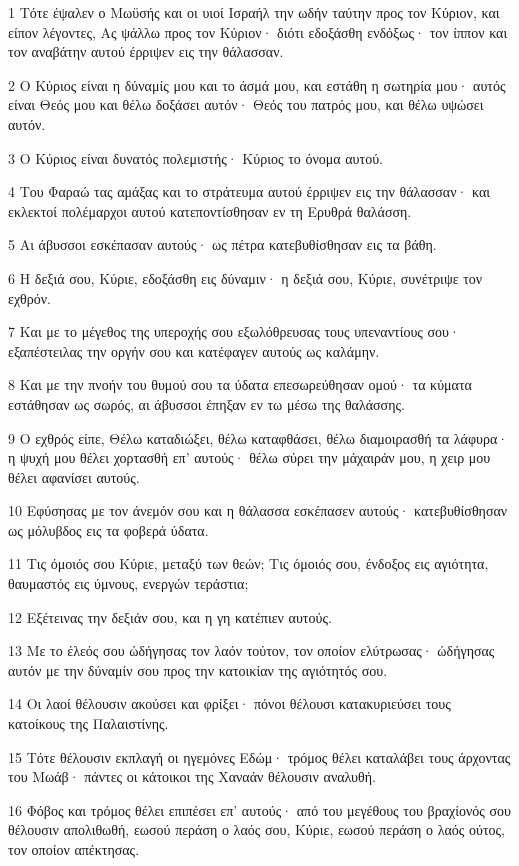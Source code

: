 \par 1 Τότε έψαλεν ο Μωϋσής και οι υιοί Ισραήλ την ωδήν ταύτην προς τον Κύριον, και είπον λέγοντες, Ας ψάλλω προς τον Κύριον· διότι εδοξάσθη ενδόξως· τον ίππον και τον αναβάτην αυτού έρριψεν εις την θάλασσαν.
\par 2 Ο Κύριος είναι η δύναμίς μου και το άσμά μου, και εστάθη η σωτηρία μου· αυτός είναι Θεός μου και θέλω δοξάσει αυτόν· Θεός του πατρός μου, και θέλω υψώσει αυτόν.
\par 3 Ο Κύριος είναι δυνατός πολεμιστής· Κύριος το όνομα αυτού.
\par 4 Του Φαραώ τας αμάξας και το στράτευμα αυτού έρριψεν εις την θάλασσαν· και εκλεκτοί πολέμαρχοι αυτού κατεποντίσθησαν εν τη Ερυθρά θαλάσση.
\par 5 Αι άβυσσοι εσκέπασαν αυτούς· ως πέτρα κατεβυθίσθησαν εις τα βάθη.
\par 6 Η δεξιά σου, Κύριε, εδοξάσθη εις δύναμιν· η δεξιά σου, Κύριε, συνέτριψε τον εχθρόν.
\par 7 Και με το μέγεθος της υπεροχής σου εξωλόθρευσας τους υπεναντίους σου· εξαπέστειλας την οργήν σου και κατέφαγεν αυτούς ως καλάμην.
\par 8 Και με την πνοήν του θυμού σου τα ύδατα επεσωρεύθησαν ομού· τα κύματα εστάθησαν ως σωρός, αι άβυσσοι έπηξαν εν τω μέσω της θαλάσσης.
\par 9 Ο εχθρός είπε, Θέλω καταδιώξει, θέλω καταφθάσει, θέλω διαμοιρασθή τα λάφυρα· η ψυχή μου θέλει χορτασθή επ' αυτούς· θέλω σύρει την μάχαιράν μου, η χειρ μου θέλει αφανίσει αυτούς.
\par 10 Εφύσησας με τον άνεμόν σου και η θάλασσα εσκέπασεν αυτούς· κατεβυθίσθησαν ως μόλυβδος εις τα φοβερά ύδατα.
\par 11 Τις όμοιός σου Κύριε, μεταξύ των θεών; Τις όμοιός σου, ένδοξος εις αγιότητα, θαυμαστός εις ύμνους, ενεργών τεράστια;
\par 12 Εξέτεινας την δεξιάν σου, και η γη κατέπιεν αυτούς.
\par 13 Με το έλεός σου ώδήγησας τον λαόν τούτον, τον οποίον ελύτρωσας· ώδήγησας αυτόν με την δύναμίν σου προς την κατοικίαν της αγιότητός σου.
\par 14 Οι λαοί θέλουσιν ακούσει και φρίξει· πόνοι θέλουσι κατακυριεύσει τους κατοίκους της Παλαιστίνης.
\par 15 Τότε θέλουσιν εκπλαγή οι ηγεμόνες Εδώμ· τρόμος θέλει καταλάβει τους άρχοντας του Μωάβ· πάντες οι κάτοικοι της Χαναάν θέλουσιν αναλυθή.
\par 16 Φόβος και τρόμος θέλει επιπέσει επ' αυτούς· από του μεγέθους του βραχίονός σου θέλουσιν απολιθωθή, εωσού περάση ο λαός σου, Κύριε, εωσού περάση ο λαός ούτος, τον οποίον απέκτησας.
